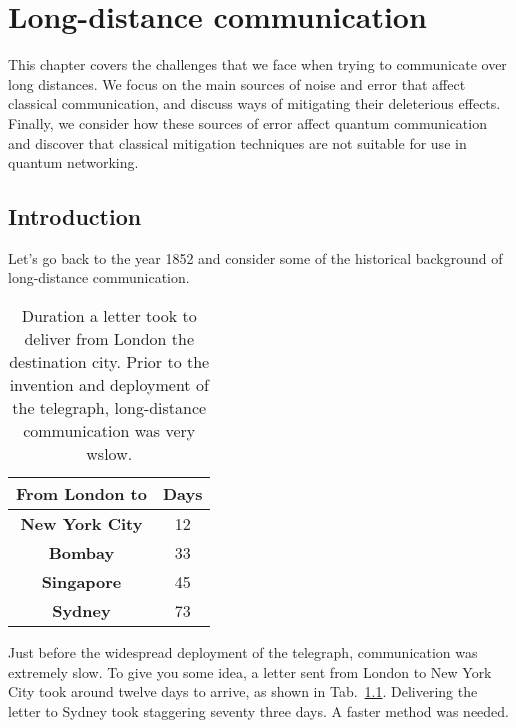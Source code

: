 \chapter{Long-distance communication}
\label{sec:11_long-distance}

This chapter covers the challenges that we face when trying to communicate over long distances.
We focus on the main sources of noise and error that affect classical communication, and discuss ways of mitigating their deleterious effects.
Finally, we consider how these sources of error affect quantum communication and discover that classical mitigation techniques are not suitable for use in quantum networking.



\section{Introduction}
\label{sec:ld-intro}

Let's go back to the year 1852 and consider some of the historical background of long-distance communication.
\begin{table}
    \setcellgapes{3pt}
    \renewcommand\theadfont{}
    \makegapedcells
    \centering
    
    \begin{tabular}{cc}
    \hline
    \textbf{From London to} & \textbf{Days} \\
    \hline
    \textbf{New York City} & 12 \\
    \textbf{Bombay} & 33 \\
    \textbf{Singapore} & 45 \\
    \textbf{Sydney} & 73 \\
    \hline
    \end{tabular}
    \caption[Communication before the telegraph.]{Duration a letter took to deliver from London the destination city. Prior to the invention and deployment of the telegraph, long-distance communication was very wslow.}
    \label{tab:london-letter}
\end{table}
Just before the widespread deployment of the telegraph, communication was extremely slow. To give you some idea, a letter sent from London to New York City took around twelve days to arrive, as shown in Tab.~\ref{tab:london-letter}. Delivering the letter to Sydney took staggering seventy three days. 
A faster method was needed. 

